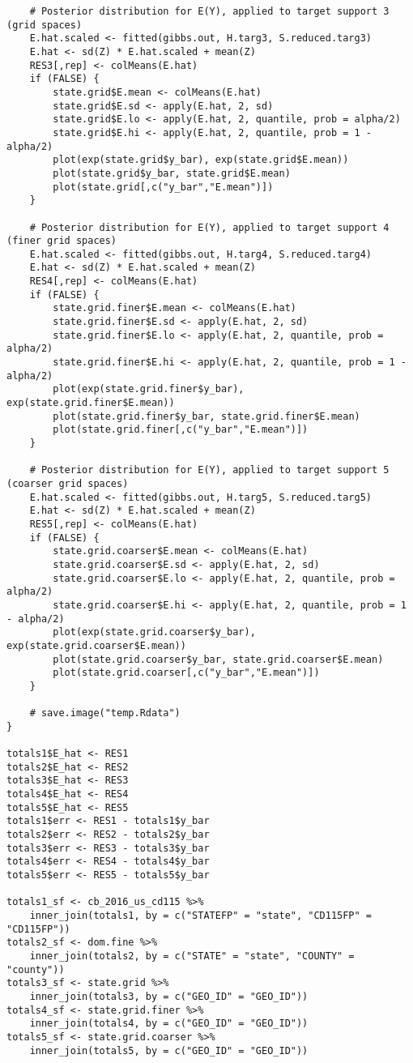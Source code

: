 \documentclass[12pt]{article}
\begin{document}
\begin{scriptsize}
\begin{verbatim}
	# Posterior distribution for E(Y), applied to target support 3 (grid spaces)
	E.hat.scaled <- fitted(gibbs.out, H.targ3, S.reduced.targ3)
	E.hat <- sd(Z) * E.hat.scaled + mean(Z)
	RES3[,rep] <- colMeans(E.hat)
	if (FALSE) {
		state.grid$E.mean <- colMeans(E.hat)
		state.grid$E.sd <- apply(E.hat, 2, sd)
		state.grid$E.lo <- apply(E.hat, 2, quantile, prob = alpha/2)
		state.grid$E.hi <- apply(E.hat, 2, quantile, prob = 1 - alpha/2)
		plot(exp(state.grid$y_bar), exp(state.grid$E.mean))
		plot(state.grid$y_bar, state.grid$E.mean)
		plot(state.grid[,c("y_bar","E.mean")])
	}

	# Posterior distribution for E(Y), applied to target support 4 (finer grid spaces)
	E.hat.scaled <- fitted(gibbs.out, H.targ4, S.reduced.targ4)
	E.hat <- sd(Z) * E.hat.scaled + mean(Z)
	RES4[,rep] <- colMeans(E.hat)
	if (FALSE) {
		state.grid.finer$E.mean <- colMeans(E.hat)
		state.grid.finer$E.sd <- apply(E.hat, 2, sd)
		state.grid.finer$E.lo <- apply(E.hat, 2, quantile, prob = alpha/2)
		state.grid.finer$E.hi <- apply(E.hat, 2, quantile, prob = 1 - alpha/2)
		plot(exp(state.grid.finer$y_bar), exp(state.grid.finer$E.mean))
		plot(state.grid.finer$y_bar, state.grid.finer$E.mean)
		plot(state.grid.finer[,c("y_bar","E.mean")])
	}

	# Posterior distribution for E(Y), applied to target support 5 (coarser grid spaces)
	E.hat.scaled <- fitted(gibbs.out, H.targ5, S.reduced.targ5)
	E.hat <- sd(Z) * E.hat.scaled + mean(Z)
	RES5[,rep] <- colMeans(E.hat)
	if (FALSE) {
		state.grid.coarser$E.mean <- colMeans(E.hat)
		state.grid.coarser$E.sd <- apply(E.hat, 2, sd)
		state.grid.coarser$E.lo <- apply(E.hat, 2, quantile, prob = alpha/2)
		state.grid.coarser$E.hi <- apply(E.hat, 2, quantile, prob = 1 - alpha/2)
		plot(exp(state.grid.coarser$y_bar), exp(state.grid.coarser$E.mean))
		plot(state.grid.coarser$y_bar, state.grid.coarser$E.mean)
		plot(state.grid.coarser[,c("y_bar","E.mean")])
	}

	# save.image("temp.Rdata")
}

totals1$E_hat <- RES1
totals2$E_hat <- RES2
totals3$E_hat <- RES3
totals4$E_hat <- RES4
totals5$E_hat <- RES5
totals1$err <- RES1 - totals1$y_bar
totals2$err <- RES2 - totals2$y_bar
totals3$err <- RES3 - totals3$y_bar
totals4$err <- RES4 - totals4$y_bar
totals5$err <- RES5 - totals5$y_bar

totals1_sf <- cb_2016_us_cd115 %>%
	inner_join(totals1, by = c("STATEFP" = "state", "CD115FP" = "CD115FP"))
totals2_sf <- dom.fine %>%
	inner_join(totals2, by = c("STATE" = "state", "COUNTY" = "county"))
totals3_sf <- state.grid %>%
	inner_join(totals3, by = c("GEO_ID" = "GEO_ID"))
totals4_sf <- state.grid.finer %>%
	inner_join(totals4, by = c("GEO_ID" = "GEO_ID"))
totals5_sf <- state.grid.coarser %>%
	inner_join(totals5, by = c("GEO_ID" = "GEO_ID"))


\end{verbatim}
\end{scriptsize}
\end{document}
